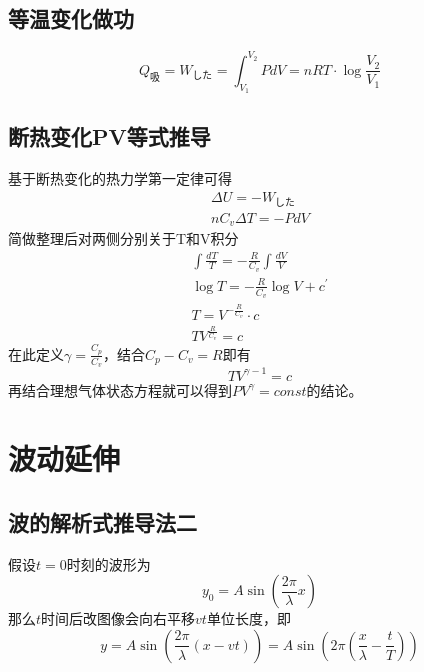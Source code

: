 \subsection{等温变化做功}

\begin{equation*}
    Q_\textrm{吸}=W_\textrm{した}=\int_{V_1}^{V_2}PdV=nRT\cdot\log\frac{V_2}{V_1}
\end{equation*}

\subsection{断热变化PV等式推导}

基于断热变化的热力学第一定律可得
\begin{gather*}
    \Delta U=-W_\textrm{した}\\
    nC_v\Delta T=-PdV
\end{gather*}
简做整理后对两侧分别关于T和V积分
\begin{gather*}
    \int\frac{dT}{T}=-\frac{R}{C_v}\int\frac{dV}{V}\\
    \log T=-\frac{R}{C_v}\log V+c^\prime\\
    T=V^{-\frac{R}{C_v}}\cdot c\\
    TV^{\frac{R}{C_v}}=c
\end{gather*}
在此定义$\gamma=\frac{C_p}{C_v}$，结合$C_p-C_v=R$即有
\begin{equation*}
    TV^{\gamma-1}=c
\end{equation*}
再结合理想气体状态方程就可以得到$PV^\gamma=const$的结论。

\section{波动延伸}

\subsection{波的解析式推导法二}

假设$t=0$时刻的波形为
\begin{equation*}
    y_0=A\sin\left(\frac{2\pi}{\lambda}x\right)
\end{equation*}
那么$t$时间后改图像会向右平移$vt$单位长度，即
\begin{equation*}
    y=A\sin\left(\frac{2\pi}{\lambda}\left(x-vt\right)\right)
    =A\sin\left(2\pi\left(\frac{x}{\lambda}-\frac{t}{T}\right)\right)
\end{equation*}

